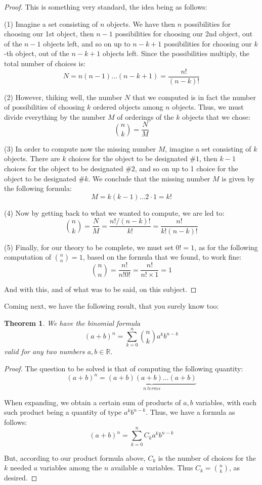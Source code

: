 \documentclass[12pt]{amsbook}
\newtheorem{theorem}{Theorem}[chapter]
\begin{document}
\begin{proof}
This is something very standard, the idea being as follows:

\medskip

(1) Imagine a set consisting of $n$ objects. We have then $n$ possibilities for choosing our 1st object, then $n-1$ possibilities for choosing our 2nd object, out of the $n-1$ objects left, and so on up to $n-k+1$ possibilities for choosing our $k$-th object, out of the $n-k+1$ objects left. Since the possibilities multiply, the total number of choices is:
$$N=n(n-1)\ldots(n-k+1)=\frac{n!}{(n-k)!}$$

(2) However, thiking well, the number $N$ that we computed is in fact the number of possibilities of choosing $k$ ordered objects among $n$ objects. Thus, we must divide everything by the number $M$ of orderings of the $k$ objects that we chose:
$$\binom{n}{k}=\frac{N}{M}$$

(3) In order to compute now the missing number $M$, imagine a set consisting of $k$ objects. There are $k$ choices for the object to be designated $\#1$, then $k-1$ choices for the object to be designated $\#2$, and so on up to 1 choice for the object to be designated $\#k$. We conclude that the missing number $M$ is given by the following formula:
$$M=k(k-1)\ldots 2\cdot 1=k!$$

(4) Now by getting back to what we wanted to compute, we are led to:
$$\binom{n}{k}
=\frac{N}{M}
=\frac{n!/(n-k)!}{k!}
=\frac{n!}{k!(n-k)!}$$

(5) Finally, for our theory to be complete, we must set $0!=1$, as for the following computation of $\binom{n}{n}=1$, based on the formula that we found, to work fine:
$$\binom{n}{n}=\frac{n!}{n!0!}=\frac{n!}{n!\times1}=1$$

And with this, and of what was to be said, on this subject.
\end{proof}

Coming next, we have the following result, that you surely know too:


\begin{theorem}
We have the binomial formula
$$(a+b)^n=\sum_{k=0}^n\binom{n}{k}a^kb^{n-k}$$
valid for any two numbers $a,b\in\mathbb R$. 
\end{theorem}

\begin{proof}
The question to be solved is that of computing the following quantity:
$$(a+b)^n=\underbrace{(a+b)(a+b)\ldots(a+b)}_{n\ terms}$$

When expanding, we obtain a certain sum of products of $a,b$ variables, with each such product being a quantity of type $a^kb^{n-k}$. Thus, we have a formula as follows:
$$(a+b)^n=\sum_{k=0}^nC_ka^kb^{n-k}$$

But, according to our product formula above, $C_k$ is the number of choices for the $k$ needed $a$ variables among the $n$ available $a$ variables. Thus $C_k=\binom{n}{k}$, as desired.
\end{proof}
\end{document}
